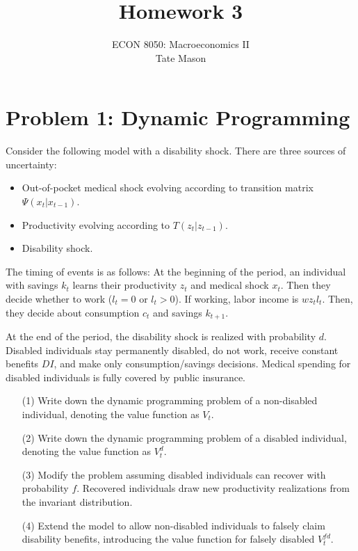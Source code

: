 \documentclass[10pt,a4paper]{article}
\begin{document}
\title{Homework 3}
\author{ECON 8050: Macroeconomics II \\ Tate Mason}
\date{}
\maketitle

\section*{Problem 1: Dynamic Programming}
Consider the following model with a disability shock. There are three sources of uncertainty:
\begin{itemize}
    \item Out-of-pocket medical shock evolving according to transition matrix $\Psi(x_t|x_{t-1})$.
    \item Productivity evolving according to $T(z_t|z_{t-1})$.
    \item Disability shock.
\end{itemize}

The timing of events is as follows: At the beginning of the period, an individual with savings $k_t$ learns their productivity $z_t$ and medical shock $x_t$. Then they decide whether to work ($l_t = 0$ or $l_t > 0$). If working, labor income is $w z_t l_t$. Then, they decide about consumption $c_t$ and savings $k_{t+1}$.

At the end of the period, the disability shock is realized with probability $d$. Disabled individuals stay permanently disabled, do not work, receive constant benefits $DI$, and make only consumption/savings decisions. Medical spending for disabled individuals is fully covered by public insurance.

\begin{enumerate}
    \item[(1)] Write down the dynamic programming problem of a non-disabled individual, denoting the value function as $V_t$.
    \item[(2)] Write down the dynamic programming problem of a disabled individual, denoting the value function as $V_t^d$.
    \item[(3)] Modify the problem assuming disabled individuals can recover with probability $f$. Recovered individuals draw new productivity realizations from the invariant distribution.
    \item[(4)] Extend the model to allow non-disabled individuals to falsely claim disability benefits, introducing the value function for falsely disabled $V_t^{fd}$.
\end{enumerate}
\end{document}
